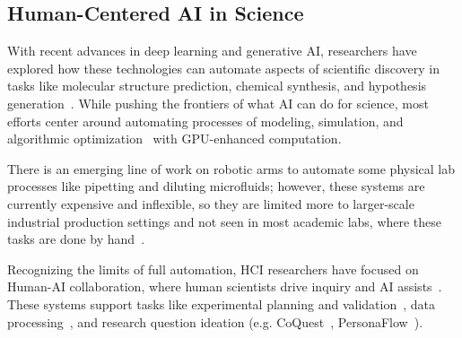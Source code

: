 \subsection{Human-Centered AI in Science}

With recent advances in deep learning and generative AI, researchers have explored how these technologies can automate aspects of scientific discovery in tasks like molecular structure prediction, chemical synthesis, and hypothesis generation~\cite{ramos2025review, jumper2021highly, reddy2025towards, baek2024researchagent, rapp2024self}. While pushing the frontiers of what AI can do for science, most efforts center around automating processes of modeling, simulation, and algorithmic optimization~\cite{lu2024ai, jablonka202314} with GPU-enhanced computation.

There is an emerging line of work on robotic arms to automate some physical lab processes like pipetting and diluting microfluids; however, these systems are currently expensive and inflexible, so they are limited more to larger-scale industrial production settings and not seen in most academic labs, where these tasks are done by hand~\cite{robotic_lab_assistants_2024}. 

Recognizing the limits of full automation, HCI researchers have focused on Human-AI collaboration, where human scientists drive inquiry and AI assists~\cite{schmidgall2025agent, o2023bioplanner}. These systems support tasks like experimental planning and validation~\cite{schmidgall2025agent, o2023bioplanner}, data processing~\cite{jablonka202314}, and research question ideation (e.g. CoQuest~\cite{liu2024how}, PersonaFlow~\cite{liu2025personaflow}).

